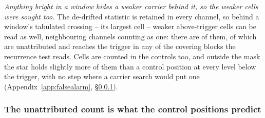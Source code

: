 \emph{Anything bright in a window hides a weaker carrier behind it, so the
weaker cells were sought too.} The de-drifted statistic is retained in every
channel, so behind a window's tabulated crossing -- its largest cell -- weaker
above-trigger cells can be read as well, neighbouring channels counting as one:
there are \CkNSecondaryWord{} of them, of which \CkNSecUnattrWord{} are
unattributed and \CkNRecurWord{} reaches the trigger in any of the covering
blocks the recurrence test reads. Cells are counted in the controls too, and
outside the mask the star holds slightly more of them than a control position
at every level below the trigger, with no step where a carrier search would put
one (Appendix~\ref{app:falsealarm}, \S\ref{sec:trigunif}).

\subsubsection{The unattributed count is what the control positions predict}
\label{sec:trigunif}

